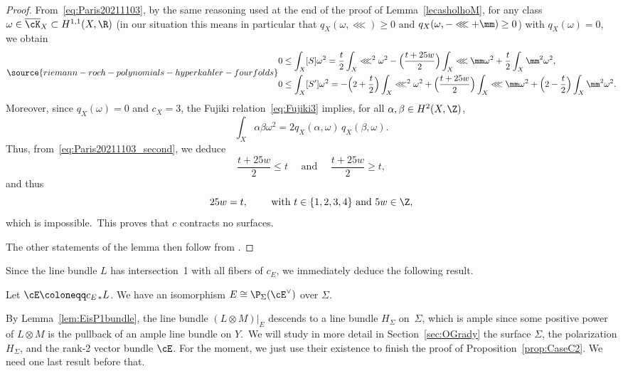 \begin{proof}
From~\eqref{eq:Paris20211103}, by the same reasoning used at the end of the proof of Lemma~\ref{lecasholhoM}, for any class $\omega\in \overline{\cK}_X\subset H^{1,1}(X,\R)$ (in our situation this means in particular that $q_X(\omega,\lll)\ge0$ and $q_X(\omega,-\lll+\mm)\geq0$) with $q_X(\omega)=0$, we obtain
\begin{equation}\label{eq:Paris20211103_second}
\source{riemann-roch-polynomials-hyperkahler-fourfolds}
\begin{split}
    & 0\leq \int_X [S]\omega^2 = \frac t2 \int_X\lll^2\omega^2- \Big(\frac {t+25w}2\Big)\int_X \lll\mm\omega^2 + \frac t2\int_X \mm^2\omega^2,  \\
    & 0\leq \int_X [S']\omega^2 = - \Big(2+\frac t2\Big)\int_X \lll^2\omega^2
     + \Big(\frac {t+25w}2\Big)\int_X \lll\mm\omega^2
     +\Big(2-\frac t2\Big)\int_X \mm^2\omega^2 .
\end{split}
\end{equation}
Moreover, since $q_X(\omega)=0$ and $c_X=3$,   the Fujiki relation~\eqref{eq:Fujiki3} implies, for all $\alpha,\beta\in H^2(X,\Z)$,
\[
\int_X \alpha\beta\omega^2 = 2 q_X(\alpha,\omega)\, q_X(\beta,\omega).
\]
Thus, from~\eqref{eq:Paris20211103_second}, we deduce
\[
\frac {t+25w}2  \leq t\quad\text{ and }\quad \frac {t+25w}2  \geq t,
\]
and thus
\[
25 w = t, \qquad \text{ with } t\in\{1,2,3,4\}\text{ and }5w\in\Z,
\]
which is impossible.\ This proves that $c$ contracts no surfaces.

The other statements of the lemma then follow from
\cite[Theorem~1.3(ii)]{wie}.
\end{proof}

Since the line bundle $L$ has intersection~1 with all fibers of $c_E$, we immediately deduce the following result.

\begin{lemm}\label{lem:EisP1bundle}
Let $\cE\coloneqq c_{E\,*}L$.
We have an isomorphism $E\cong\P_{\Sigma}(\cE^\vee)$ over $\Sigma$.
\end{lemm}

By Lemma~\ref{lem:EisP1bundle}, the line bundle $(L\otimes M)\vert_E$ descends to a line bundle $H_{\Sigma}$ on~$\Sigma$, which is ample since some positive power of $L\otimes M$ is the pullback of an ample line bundle on $Y$.\
We will study  in more detail in Section~\ref{sec:OGrady} the surface $\Sigma$, the polarization $H_{\Sigma}$, and the rank-2 vector bundle $\cE$.
For the moment, we just use their existence to finish the proof of Proposition~\ref{prop:CaseC2}.
We need one last result before that.

